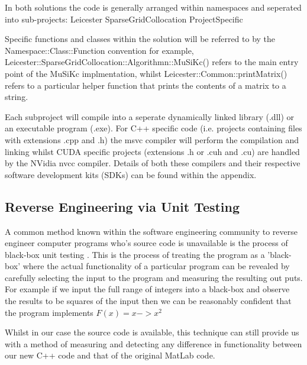 \documentclass[a4paper]{amsart}
\begin{document}
In both solutions the code is generally arranged within namespaces and seperated into sub-projects:
Leicester
	SparseGridCollocation
		ProjectSpecific

Specific functions and classes within the solution will be referred to by the Namespace::Class::Function convention for example, Leicester::SparseGridCollocation::Algorithmn::MuSiKc() refers to the main entry point of the MuSiKc implmentation, whilst Leicester::Common::printMatrix() refers to a particular helper function that prints the contents of a matrix to a string.

Each subproject will compile into a seperate dynamically linked library (.dll) or an executable program (.exe). For C++ specific code (i.e. projects containing files with extensions .cpp and .h) the msvc compiler will perform the compilation and linking whilst CUDA specific projects (extensions .h or .cuh and .cu) are handled by the NVidia nvcc compiler. Details of both these compilers and their respective software development kits (SDKs) can be found within the appendix.

\subsection{Reverse Engineering via Unit Testing}
A common method known within the software engineering community to reverse engineer computer programs who's source code is unavailable is the process of black-box unit testing \cite{unit testing}. This is the process of treating the program as a 'black-box' where the actual functionality of a particular program can be revealed by carefully selecting the input to the program and measuring the resulting out puts. For example if we input the full range of integers into a black-box and observe the results to be squares of the input then we can be reasonably confident that the program implements $F(x) = x -> x^{2}$

Whilst in our case the source code is available, this technique can still provide us with a method of measuring and detecting any difference in functionality between our new C++ code and that of the original MatLab code.
\end{document}
